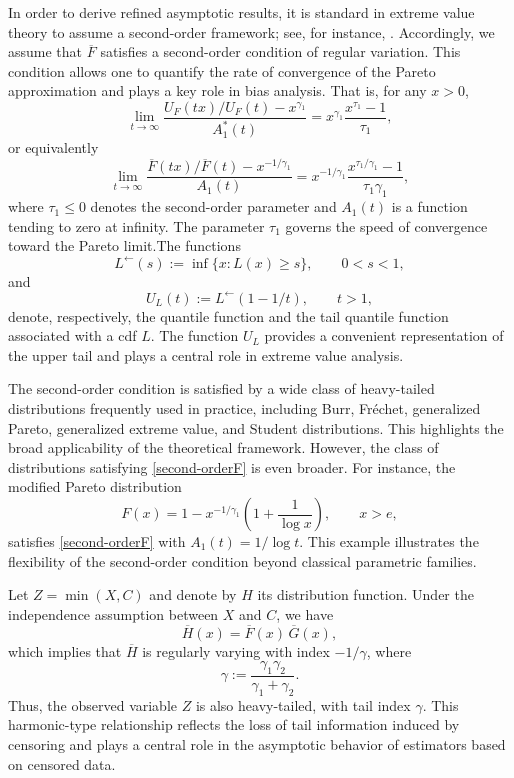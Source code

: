 \documentclass[reqno,openbib,runningheads,a4paper,12pt]{amsart}%
\begin{document}
\noindent In order to derive refined asymptotic results, it is standard in
extreme value theory to assume a second-order framework; see, for instance,
\cite{deHF06}. Accordingly, we assume that $\overline{F}$ satisfies a
second-order condition of regular variation. This condition allows one to
quantify the rate of convergence of the Pareto approximation and plays a key
role in bias analysis. That is, for any $x>0$,
\[
\lim_{t\rightarrow\infty} \frac{U_{F}(tx)/U_{F}(t)-x^{\gamma_{1}}}{A_{1}%
^{\ast}(t)} = x^{\gamma_{1}}\frac{x^{\tau_{1}}-1}{\tau_{1}},
\]
or equivalently
\begin{equation}
\lim_{t\rightarrow\infty} \frac{\overline{F}(tx)/\overline{F}(t)-x^{-1/\gamma
_{1}}}{A_{1}(t)} = x^{-1/\gamma_{1}}\frac{x^{\tau_{1}/\gamma_{1}}-1}{\tau
_{1}\gamma_{1}}, \label{second-orderF}%
\end{equation}
where $\tau_{1}\leq0$ denotes the second-order parameter and $A_{1}(t)$ is a
function tending to zero at infinity. The parameter $\tau_{1}$ governs the
speed of convergence toward the Pareto limit.\smallskip\noindent The
functions
\[
L^{\leftarrow}(s):=\inf\{x:L(x)\geq s\},\qquad0<s<1,
\]
and
\[
U_{L}(t):=L^{\leftarrow}(1-1/t),\qquad t>1,
\]
denote, respectively, the quantile function and the tail quantile function
associated with a cdf $L$. The function $U_{L}$ provides a convenient
representation of the upper tail and plays a central role in extreme value
analysis.\smallskip

\noindent The second-order condition is satisfied by a wide class of
heavy-tailed distributions frequently used in practice, including Burr,
Fr\'{e}chet, generalized Pareto, generalized extreme value, and Student
distributions. This highlights the broad applicability of the theoretical
framework. However, the class of distributions satisfying
\eqref{second-orderF} is even broader. For instance, the modified Pareto
distribution
\[
F(x)=1-x^{-1/\gamma_{1}}\left(  1+\frac{1}{\log x}\right)  , \qquad x>e,
\]
satisfies \eqref{second-orderF} with $A_{1}(t)=1/\log t$. This example
illustrates the flexibility of the second-order condition beyond classical
parametric families.\smallskip

\noindent Let $Z=\min(X,C)$ and denote by $H$ its distribution function. Under
the independence assumption between $X$ and $C$, we have
\[
\overline{H}(x)=\overline{F}(x)\,\overline{G}(x),
\]
which implies that $\overline{H}$ is regularly varying with index $-1/\gamma$,
where
\[
\gamma:=\frac{\gamma_{1}\gamma_{2}}{\gamma_{1}+\gamma_{2}}.
\]
Thus, the observed variable $Z$ is also heavy-tailed, with tail index $\gamma
$. This harmonic-type relationship reflects the loss of tail information
induced by censoring and plays a central role in the asymptotic behavior of
estimators based on censored data.\smallskip
\end{document}
